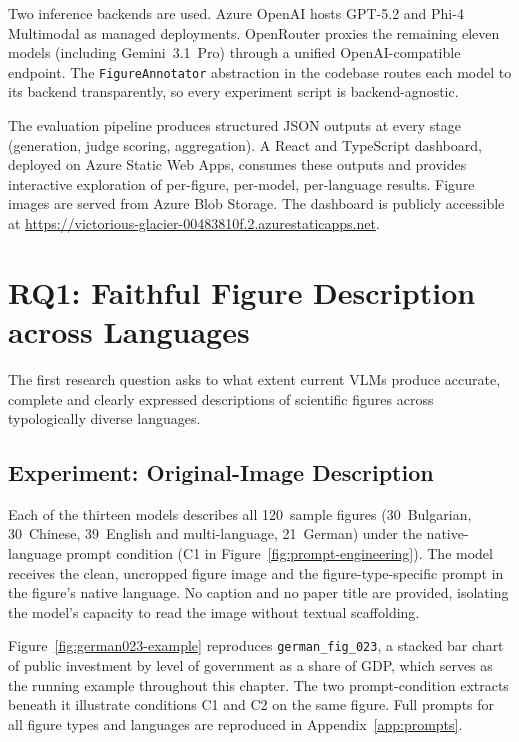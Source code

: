 Two inference backends are used. Azure OpenAI hosts GPT-5.2
and Phi-4 Multimodal as managed deployments. OpenRouter proxies
the remaining eleven models (including Gemini~3.1~Pro) through
a unified OpenAI-compatible endpoint. The
\texttt{FigureAnnotator} abstraction in the codebase routes each
model to its backend transparently, so every experiment script
is backend-agnostic.

\label{sec:impl-infra}
The evaluation pipeline produces structured JSON outputs at
every stage (generation, judge scoring, aggregation). A React
and TypeScript dashboard, deployed on Azure Static Web Apps,
consumes these outputs and provides interactive exploration of
per-figure, per-model, per-language results. Figure images are
served from Azure Blob Storage. The dashboard is publicly
accessible at \url{https://victorious-glacier-00483810f.2.azurestaticapps.net}.


\section{RQ1: Faithful Figure Description across Languages}
\label{sec:impl-rq1}

The first research question asks to what extent current VLMs
produce accurate, complete and clearly expressed descriptions
of scientific figures across typologically diverse languages.

\subsection{Experiment: Original-Image Description}
\label{sec:impl-rq1-original}

Each of the thirteen models describes all 120~sample figures
(30~Bulgarian, 30~Chinese, 39~English and multi-language,
21~German) under the native-language prompt condition (C1 in
Figure~\ref{fig:prompt-engineering}). The model receives the
clean, uncropped figure image and the figure-type-specific
prompt in the figure's native language. No caption and no paper
title are provided, isolating the model's capacity to read the
image without textual scaffolding.

Figure~\ref{fig:german023-example} reproduces
\texttt{german\_fig\_023}, a stacked bar chart of public
investment by level of government as a share of GDP, which
serves as the running example throughout this chapter. The
two prompt-condition extracts beneath it illustrate conditions
C1 and C2 on the same figure. Full prompts for all
figure types and languages are reproduced in
Appendix~\ref{app:prompts}.

